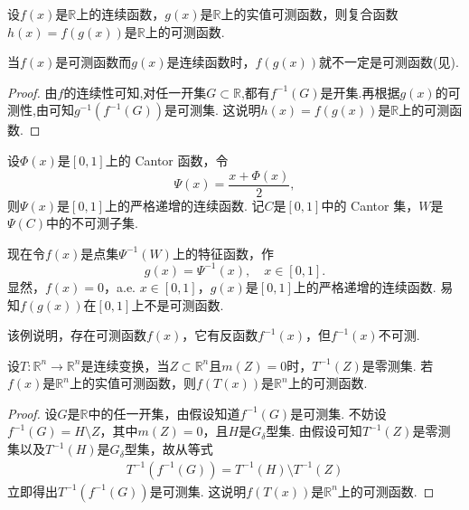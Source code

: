 \documentclass[../../main.tex]{subfiles}
\begin{document}
\begin{theorem}\label{theorem:连续函数复合可测函数也可测}
设\(f(x)\)是\(\mathbb{R}\)上的连续函数，\(g(x)\)是\(\mathbb{R}\)上的实值可测函数，则复合函数\(h(x) = f(g(x))\)是\(\mathbb{R}\)上的可测函数.
\end{theorem}
\begin{remark}
当\(f(x)\)是可测函数而\(g(x)\)是连续函数时，\(f(g(x))\)就不一定是可测函数(见).
\end{remark}
\begin{proof}
由$f$的连续性可知,对任一开集\(G \subset \mathbb{R}\),都有\(f^{-1}(G)\)是开集.再根据\(g(x)\)的可测性,由可知\(g^{-1}(f^{-1}(G))\)是可测集. 这说明\(h(x) = f(g(x))\)是\(\mathbb{R}\)上的可测函数. 
\end{proof}

\begin{example}\label{example:复合函数的可测性反例1}
设\(\varPhi(x)\)是\([0, 1]\)上的 Cantor 函数，令
\[
\varPsi(x)=\frac{x+\varPhi(x)}{2},
\]
则\(\varPsi(x)\)是\([0, 1]\)上的严格递增的连续函数. 记\(C\)是\([0, 1]\)中的 Cantor 集，\(W\)是\(\varPsi(C)\)中的不可测子集.

现在令\(f(x)\)是点集\(\varPsi^{-1}(W)\)上的特征函数，作
\[
g(x)=\varPsi^{-1}(x),\quad x\in[0, 1].
\]
显然，\(f(x) = 0\)，a.e. \(x \in [0, 1]\)，\(g(x)\)是\([0, 1]\)上的严格递增的连续函数. 易知\(f(g(x))\)在\([0, 1]\)上不是可测函数.
\end{example}
\begin{remark}
该例说明，存在可测函数\(f(x)\)，它有反函数\(f^{-1}(x)\)，但\(f^{-1}(x)\)不可测. 
\end{remark}

\begin{theorem}
设\(T: \mathbb{R}^{n} \to \mathbb{R}^{n}\)是连续变换，当\(Z \subset \mathbb{R}^{n}\)且\(m(Z) = 0\)时，\(T^{-1}(Z)\)是零测集. 若\(f(x)\)是\(\mathbb{R}^{n}\)上的实值可测函数，则\(f(T(x))\)是\(\mathbb{R}^{n}\)上的可测函数.
\end{theorem}
\begin{proof}
设\(G\)是\(\mathbb{R}\)中的任一开集，由假设知道\(f^{-1}(G)\)是可测集. 不妨设\(f^{-1}(G) = H \setminus Z\)，其中\(m(Z) = 0\)，且\(H\)是\(G_{\delta}\)型集. 由假设可知\(T^{-1}(Z)\)是零测集以及\(T^{-1}(H)\)是\(G_{\delta}\)型集，故从等式
\begin{align*}
T^{-1}(f^{-1}(G)) = T^{-1}(H) \setminus T^{-1}(Z)
\end{align*}
立即得出\(T^{-1}(f^{-1}(G))\)是可测集. 这说明\(f(T(x))\)是\(\mathbb{R}^{n}\)上的可测函数.
\end{proof}
\end{document}
